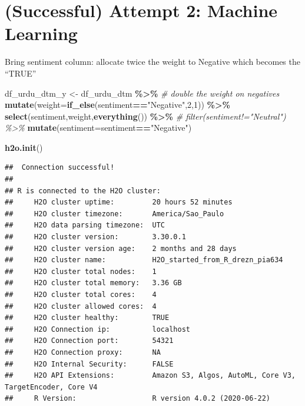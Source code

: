 \documentclass[
]{article}
\newenvironment{Shaded}{\begin{snugshade}}{\end{snugshade}}
\newcommand{\CommentTok}[1]{\textcolor[rgb]{0.56,0.35,0.01}{\textit{#1}}}
\newcommand{\DataTypeTok}[1]{\textcolor[rgb]{0.13,0.29,0.53}{#1}}
\newcommand{\DecValTok}[1]{\textcolor[rgb]{0.00,0.00,0.81}{#1}}
\newcommand{\KeywordTok}[1]{\textcolor[rgb]{0.13,0.29,0.53}{\textbf{#1}}}
\newcommand{\NormalTok}[1]{#1}
\newcommand{\OperatorTok}[1]{\textcolor[rgb]{0.81,0.36,0.00}{\textbf{#1}}}
\newcommand{\StringTok}[1]{\textcolor[rgb]{0.31,0.60,0.02}{#1}}
\begin{document}
\hypertarget{successful-attempt-2-machine-learning}{%
\section{(Successful) Attempt 2: Machine
Learning}\label{successful-attempt-2-machine-learning}}

Bring sentiment column: allocate twice the weight to Negative which
becomes the ``TRUE''

\begin{Shaded}
\begin{Highlighting}[]
\NormalTok{df\_urdu\_dtm\_y \textless{}{-}}\StringTok{ }\NormalTok{df\_urdu\_dtm }\OperatorTok{\%\textgreater{}\%}
\StringTok{  }\CommentTok{\# double the weight on negatives}
\StringTok{  }\KeywordTok{mutate}\NormalTok{(}\DataTypeTok{weight=}\KeywordTok{if\_else}\NormalTok{(sentiment}\OperatorTok{==}\StringTok{"Negative"}\NormalTok{,}\DecValTok{2}\NormalTok{,}\DecValTok{1}\NormalTok{)) }\OperatorTok{\%\textgreater{}\%}
\StringTok{  }\KeywordTok{select}\NormalTok{(sentiment,weight,}\KeywordTok{everything}\NormalTok{()) }\OperatorTok{\%\textgreater{}\%}
\StringTok{  }\CommentTok{\# filter(sentiment!="Neutral") \%\textgreater{}\%}
\StringTok{  }\KeywordTok{mutate}\NormalTok{(}\DataTypeTok{sentiment=}\NormalTok{sentiment}\OperatorTok{==}\StringTok{"Negative"}\NormalTok{)}
\end{Highlighting}
\end{Shaded}

\begin{Shaded}
\begin{Highlighting}[]
\KeywordTok{h2o.init}\NormalTok{()}
\end{Highlighting}
\end{Shaded}

\begin{verbatim}
##  Connection successful!
## 
## R is connected to the H2O cluster: 
##     H2O cluster uptime:         20 hours 52 minutes 
##     H2O cluster timezone:       America/Sao_Paulo 
##     H2O data parsing timezone:  UTC 
##     H2O cluster version:        3.30.0.1 
##     H2O cluster version age:    2 months and 28 days  
##     H2O cluster name:           H2O_started_from_R_drezn_pia634 
##     H2O cluster total nodes:    1 
##     H2O cluster total memory:   3.36 GB 
##     H2O cluster total cores:    4 
##     H2O cluster allowed cores:  4 
##     H2O cluster healthy:        TRUE 
##     H2O Connection ip:          localhost 
##     H2O Connection port:        54321 
##     H2O Connection proxy:       NA 
##     H2O Internal Security:      FALSE 
##     H2O API Extensions:         Amazon S3, Algos, AutoML, Core V3, TargetEncoder, Core V4 
##     R Version:                  R version 4.0.2 (2020-06-22)
\end{verbatim}
\end{document}
